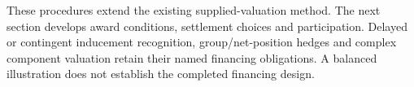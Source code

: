 These procedures extend the existing supplied-valuation method. The next section develops award conditions, settlement choices and participation. Delayed or contingent inducement recognition, group/net-position hedges and complex component valuation retain their named financing obligations. A balanced illustration does not establish the completed financing design.

